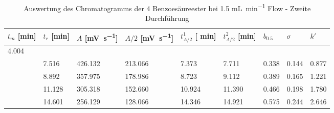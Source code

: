 \documentclass{article}
\begin{document}
 \begin{table}[ht!]
  \centering
 \begin{tabularx}{\textwidth}{XXXXXXXXX}
 $t_m $ [\si{\minute}] & $t_r$ [\si{\minute}] & $A$ [\si{\milli\volt\per\second}] & $A/2$ [\si{\milli\volt\per\second}] & $t_{A/2}^1$ [ \si{\minute}] & $t_{A/2}^2$  [\si{\minute}] &
 $b_{0.5}$ & $\sigma$ & $k'$\\
\hline
4.004 &  &&&&&&& \\
&7.516& 426.132 & 213.066  & 7.373 & 7.711&     0.338 & 0.144 & 0.877 \\
&8.892 & 357.975 & 178.986 & 8.723 & 9.112 &    0.389 & 0.165 & 1.221\\
&11.128 & 305.318 & 152.660 & 10.924 & 11.390 & 0.466 & 0.198 & 1.780 \\
&14.601&256.129&128.066    & 14.346 & 14.921 &  0.575 & 0.244 & 2.646 \\
\end{tabularx}
   \renewcommand\thetable{5}

  \caption{Auswertung des Chromatogramms der 4 Benzoesäureester bei 1.5 \si{\milli\liter\per\minute} Flow - Zweite Durchführung}
\end{table}
\end{document}
